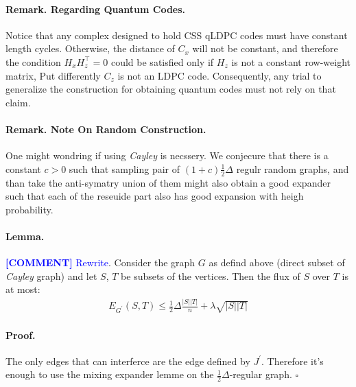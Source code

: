 \documentclass[sigplan,screen]{acmart}
\newcommand{\commentt}[1]{\textcolor{blue}{ \textbf{[COMMENT]} #1}}
\newcommand{\ctt}[1]{\commentt{#1}}
\begin{document}
\begin{multicols*}{2}
  \paragraph{Remark. Regarding Quantum Codes.} Notice that any complex designed to hold CSS qLDPC codes must have constant length cycles. Otherwise, the distance of $C_{x}$ will not be constant, and therefore the condition $H_{x}H_{z}^{\top} =0$ could be satisfied only if $H_{z}$ is not a constant row-weight matrix, Put differently $C_{z}$ is not an LDPC code. Consequently, any trial to generalize the construction for obtaining quantum codes must not rely on that claim.    

  \paragraph{Remark. Note On Random Construction.} One might wondring if using \emph{Cayley} is necssery. We conjecure that there is a constant $c > 0$ such that sampling pair of  $\left( 1 + c \right)\frac{1}{2}\Delta$ regulr random graphs, and than take the anti-symatry union of them might also obtain a good expander such that each of the reseuide part also has good expansion with heigh probability.  
  \paragraph{Lemma.} \ctt{Rewrite}. Consider the graph $G$ as defind above (direct subset of \emph{Cayley} graph) and let $S$, $T$ be subsets of the vertices. Then the flux of $S$ over $T$ is at most: 
  \begin{equation*}
    \begin{split}
      E_{G^{\prime}}(S,T) \le \frac{1}{2} \Delta\frac{|S||T|}{n} + \lambda\sqrt{|S||T|} 
    \end{split}
  \end{equation*} 

  \paragraph{Proof.} The only edges that can interferce are the edge defined by $J^{\prime}$. Therefore it's enough to use the mixing expander lemme on the $\frac{1}{2}\Delta$-regular graph. $\square$



\end{multicols*}
\end{document}
